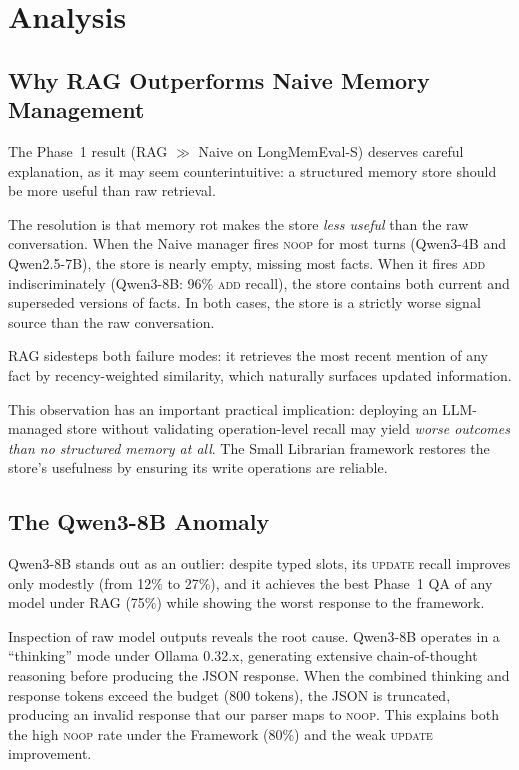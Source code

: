 \documentclass[10pt, twocolumn]{article}
\begin{document}
\section{Analysis}
\label{sec:analysis}

\subsection{Why RAG Outperforms Naive Memory Management}
\label{sec:rag_analysis}

The Phase~1 result (RAG $\gg$ Naive on LongMemEval-S) deserves careful
explanation, as it may seem counterintuitive: a structured memory store
should be more useful than raw retrieval.

The resolution is that memory rot makes the store \emph{less useful} than
the raw conversation.
When the Naive manager fires \textsc{noop} for most turns (Qwen3-4B and
Qwen2.5-7B), the store is nearly empty, missing most facts.
When it fires \textsc{add} indiscriminately (Qwen3-8B: 96\% \textsc{add}
recall), the store contains both current and superseded versions of facts.
In both cases, the store is a strictly worse signal source than the raw
conversation.

RAG sidesteps both failure modes: it retrieves the most recent mention of
any fact by recency-weighted similarity, which naturally surfaces updated
information.

This observation has an important practical implication: deploying an
LLM-managed store without validating operation-level recall may yield
\emph{worse outcomes than no structured memory at all}.
The Small Librarian framework restores the store's usefulness by ensuring
its write operations are reliable.

\subsection{The Qwen3-8B Anomaly}
\label{sec:anomaly}

Qwen3-8B stands out as an outlier: despite typed slots, its \textsc{update}
recall improves only modestly (from 12\% to 27\%), and it achieves the best
Phase~1 QA of any model under RAG (75\%) while showing the worst response to
the framework.

Inspection of raw model outputs reveals the root cause.
Qwen3-8B operates in a ``thinking'' mode under Ollama 0.32.x, generating
extensive chain-of-thought reasoning before producing the JSON response.
When the combined thinking and response tokens exceed the budget (800 tokens),
the JSON is truncated, producing an invalid response that our parser maps to
\textsc{noop}.
This explains both the high \textsc{noop} rate under the Framework (80\%) and
the weak \textsc{update} improvement.
\end{document}
